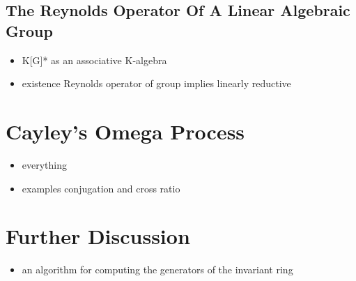 \documentclass[11pt]{article}
\begin{document}
\subsection*{The Reynolds Operator Of A Linear Algebraic Group}
\label{sec-3-3}
\begin{itemize}
\item K[G]* as an associative K-algebra
\item existence Reynolds operator of group implies linearly reductive
\end{itemize}
\section*{Cayley's Omega Process}
\label{sec-4}
\begin{itemize}
\item everything
\item examples conjugation and cross ratio
\end{itemize}
\section*{Further Discussion}
\label{sec-5}
\begin{itemize}
\item an algorithm for computing the generators of the invariant ring
\end{itemize}
\end{document}
